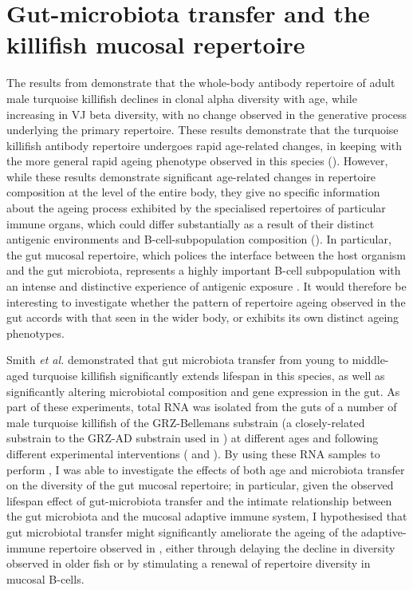 \FloatBarrier
\clearpage

\section{Gut-microbiota transfer and the killifish mucosal repertoire}
\label{sec:igseq_gut}

The results from  demonstrate that the whole-body antibody repertoire of adult male turquoise killifish declines in clonal alpha diversity with age, while increasing in VJ beta diversity, with no change observed in the generative process underlying the primary repertoire. These results demonstrate that the turquoise killifish antibody repertoire undergoes rapid age-related changes, in keeping with the more general rapid ageing phenotype observed in this species (). However, while these results demonstrate significant age-related changes in repertoire composition at the level of the entire body, they give no specific information about the ageing process exhibited by the specialised repertoires of particular immune organs, which could differ substantially as a result of their distinct antigenic environments and B-cell-subpopulation composition (). In particular, the gut mucosal repertoire, which polices the interface between the host organism and the gut microbiota, represents a highly important B-cell subpopulation with an intense and distinctive experience of antigenic exposure \parencite{spencer2016intestinal}. It would therefore be interesting to investigate whether the pattern of repertoire ageing observed in the gut accords with that seen in the wider body, or exhibits its own distinct ageing phenotypes.

Smith \textit{et al.} \parencite{smith2017microbiota} demonstrated that gut microbiota transfer from young to middle-aged turquoise killifish significantly extends lifespan in this species, as well as significantly altering microbiotal composition and gene expression in the gut. As part of these experiments, total RNA was isolated from the guts of a number of male turquoise killifish of the GRZ-Bellemans substrain (a closely-related substrain to the GRZ-AD substrain used in ) at different ages and following different experimental interventions ( and ). By using these RNA samples to perform \Igseq, I was able to investigate the effects of both age and microbiota transfer on the diversity of the gut mucosal repertoire; in particular, given the observed lifespan effect of gut-microbiota transfer and the intimate relationship between the gut microbiota and the mucosal adaptive immune system, I hypothesised that gut microbiotal transfer might significantly ameliorate the ageing of the adaptive-immune repertoire observed in , either through delaying the decline in diversity observed in older fish or by stimulating a renewal of repertoire diversity in mucosal B-cells.

